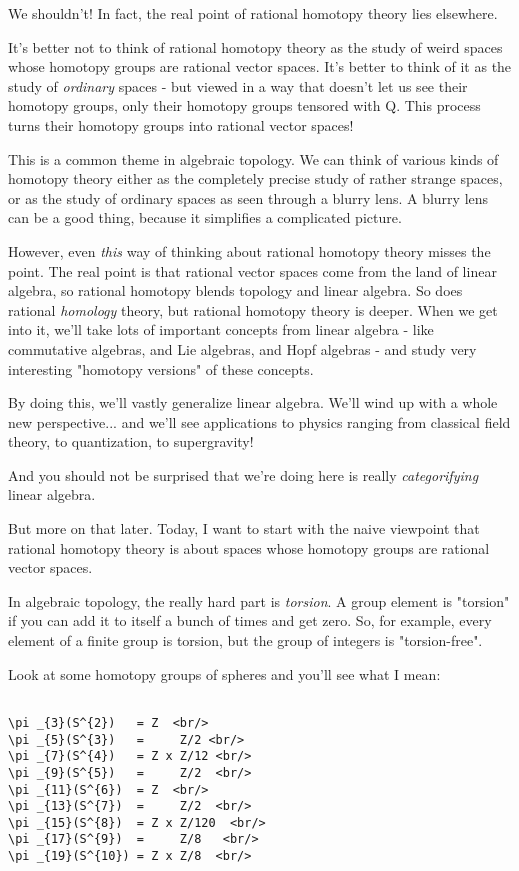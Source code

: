 We shouldn't!  In fact, the real point of rational homotopy theory
lies elsewhere. 

It's better not to think of rational homotopy theory as the study
of weird spaces whose homotopy groups are rational vector spaces.
It's better to think of it as the study of \emph{ordinary} spaces -
but viewed in a way that doesn't let us see their homotopy
groups, only their homotopy groups tensored with Q.  This process
turns their homotopy groups into rational vector spaces!

This is a common theme in algebraic topology.  We can think of
various kinds of homotopy theory either as the completely precise
study of rather strange spaces, or as the study of ordinary spaces
as seen through a blurry lens.  A blurry lens can be a good thing,
because it simplifies a complicated picture.

However, even \emph{this} way of thinking about rational homotopy
theory misses the point.  The real point is that rational vector
spaces come from the land of linear algebra, so rational homotopy
blends topology and linear algebra.  So does rational \emph{homology}
theory, but rational homotopy theory is deeper.  When we get into it,
we'll take lots of important concepts from linear algebra - like
commutative algebras, and Lie algebras, and Hopf algebras - and
study very interesting "homotopy versions" of these concepts.

By doing this, we'll vastly generalize linear algebra.  We'll wind up
with a whole new perspective... and we'll see applications to physics
ranging from classical field theory, to quantization, to supergravity!

And you should not be surprised that we're doing here is really
\emph{categorifying} linear algebra.

But more on that later.  Today, I want to start with the naive
viewpoint that rational homotopy theory is about spaces whose homotopy
groups are rational vector spaces.  

In algebraic topology, the really hard part is \emph{torsion}.  A group
element is "torsion" if you can add it to itself a bunch of times
and get zero.  So, for example, every element of a finite group
is torsion, but the group of integers is "torsion-free".

Look at some homotopy groups of spheres and you'll see what I mean:


\begin{verbatim}

\pi _{3}(S^{2})   = Z  <br/>
\pi _{5}(S^{3})   =     Z/2 <br/>
\pi _{7}(S^{4})   = Z x Z/12 <br/>
\pi _{9}(S^{5})   =     Z/2  <br/>
\pi _{11}(S^{6})  = Z  <br/>
\pi _{13}(S^{7})  =     Z/2  <br/>
\pi _{15}(S^{8})  = Z x Z/120  <br/>
\pi _{17}(S^{9})  =     Z/8   <br/>
\pi _{19}(S^{10}) = Z x Z/8  <br/>
\end{verbatim}
    

